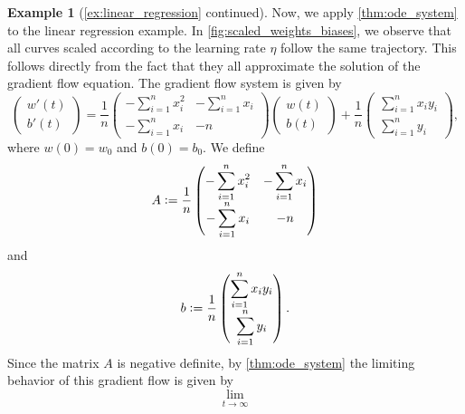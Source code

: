 \documentclass[12pt]{article}
\theoremstyle{definition}
\newtheorem{example}[example]{Example}
\numberwithin{equation}{section}
\newcommand{\defeq}{\vcentcolon=}
\begin{document}
\begin{example}[\autoref{ex:linear_regression} continued]
  Now, we apply \autoref{thm:ode_system} to the linear regression example. In \autoref{fig:scaled_weights_biases}, we observe that all curves scaled according to the learning rate $\eta$ follow the same trajectory. This follows directly from the fact that they all approximate the solution of the gradient flow equation. The gradient flow system is given by
  \begin{equation*}
    \begin{pmatrix}
      w'(t)      \\
      b'(t)     
  \end{pmatrix}
  = \frac{1}{n}
  \begin{pmatrix}
    -  \displaystyle\sum_{i=1}^n x_i^2  &  -  \displaystyle\sum_{i=1}^n x_i      \\
      -  \displaystyle\sum_{i=1}^n x_i  &  -n      
  \end{pmatrix}
  \begin{pmatrix}
    w(t)     \\
    b(t)    
  \end{pmatrix}
  + \frac{1}{n}
  \begin{pmatrix}
      \displaystyle\sum_{i=1}^n x_i y_i     \\
      \displaystyle\sum_{i=1}^n y_i    
  \end{pmatrix},
  \end{equation*}
  where $w(0) = w_{0}$ and $b(0) = b_0$. We define 
  \begin{equation*}
    A \defeq \frac{1}{n}
    \begin{pmatrix}
      -  \displaystyle\sum_{i=1}^n x_i^2  &  -  \displaystyle\sum_{i=1}^n x_i      \\
        -  \displaystyle\sum_{i=1}^n x_i  &  -n      
    \end{pmatrix}
  \end{equation*}
  and
  \begin{equation*}
    b \defeq
    \frac{1}{n}
  \begin{pmatrix}
      \displaystyle\sum_{i=1}^n x_i y_i     \\
      \displaystyle\sum_{i=1}^n y_i    
  \end{pmatrix}.
  \end{equation*}
  Since the matrix $A$ is negative definite, by \autoref{thm:ode_system} the limiting behavior of this gradient flow is given by 
  \begin{equation*}
    \lim_{t \rightarrow \infty} 

\end{equation*}
\end{example}
\end{document}
